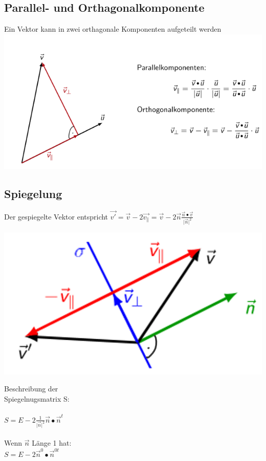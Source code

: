 			
			\subsection{Parallel- und Orthagonalkomponente}
			Ein Vektor kann in zwei orthagonale Komponenten aufgeteilt werden \\					\includegraphics[width=0.65\linewidth]{Bilder/parallel-orthagonal}
			
			
			\subsection{Spiegelung}
			Der gespiegelte Vektor entspricht $\vec{v'} = \vec{v} - 2 \vec{v_{\parallel}} = \vec{v} - 2 \vec{n} \frac{\vec{n} \bullet \vec{v}}{\vert \vec{n} \vert ^2} $ \\
			\begin{minipage}[b]{.5\linewidth} 
  			\includegraphics[width=\linewidth]{Bilder/spiegelung}
			\end{minipage}
			\hfill
			\begin{minipage}[b]{.45\linewidth} 
			Beschreibung der \\
			Spiegelnugsmatrix S: \\
			\\
			$S = E - 2 \frac{1}{\vert \vec{n} \vert ^2} \vec{n} \bullet \vec{n}^t$  	\\
			\\
			Wenn $\vec{n}$  Länge 1 hat: \\
			$S = E - 2 \vec{n}^0 \bullet \vec{n}^{0 t}$  	
			\end{minipage}						
			
